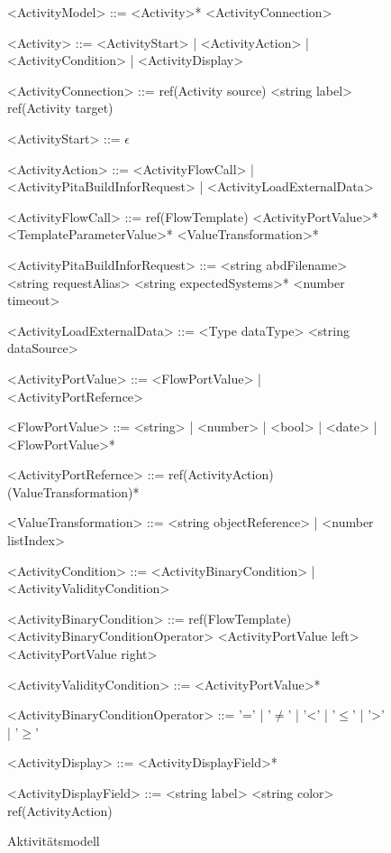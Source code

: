 \documentclass{article}
\begin{document}
    \begin{figure}
        \begin{grammar}
            <ActivityModel> ::= <Activity>* <ActivityConnection>

            <Activity> ::= <ActivityStart>
            | <ActivityAction>
            | <ActivityCondition>
            | <ActivityDisplay>

            <ActivityConnection> ::= ref(Activity source) <string label> ref(Activity target)

            <ActivityStart> ::= $\epsilon$

            <ActivityAction> ::= <ActivityFlowCall>
            | <ActivityPitaBuildInforRequest>
            | <ActivityLoadExternalData>

            <ActivityFlowCall> ::= ref(FlowTemplate) <ActivityPortValue>* <TemplateParameterValue>* <ValueTransformation>*

            <ActivityPitaBuildInforRequest> ::= <string abdFilename> <string requestAlias> <string expectedSystems>* <number timeout>

            <ActivityLoadExternalData> ::= <Type dataType> <string dataSource>

            <ActivityPortValue> ::= <FlowPortValue>
            | <ActivityPortRefernce>

            <FlowPortValue> ::= <string>
            | <number>
            | <bool>
            | <date>
            | <FlowPortValue>*

            <ActivityPortRefernce> ::= ref(ActivityAction) (ValueTransformation)*

            <ValueTransformation> ::= <string objectReference>
            | <number listIndex>

            <ActivityCondition> ::= <ActivityBinaryCondition>
            | <ActivityValidityCondition>

            <ActivityBinaryCondition> ::= ref(FlowTemplate) <ActivityBinaryConditionOperator> <ActivityPortValue left> <ActivityPortValue right>

            <ActivityValidityCondition> ::= <ActivityPortValue>*

            <ActivityBinaryConditionOperator> ::= '='
            | '$\neq$' 
            | '\textless' 
            | '$\leq$' 
            | '\textgreater' 
            | '$\geq$'

            <ActivityDisplay> ::= <ActivityDisplayField>*

            <ActivityDisplayField> ::= <string label> <string color> ref(ActivityAction)
        \end{grammar}
        \caption{Aktivitätsmodell}
        \label{Aktivitätsmodell}
    \end{figure}    
    \newpage
\end{document}
